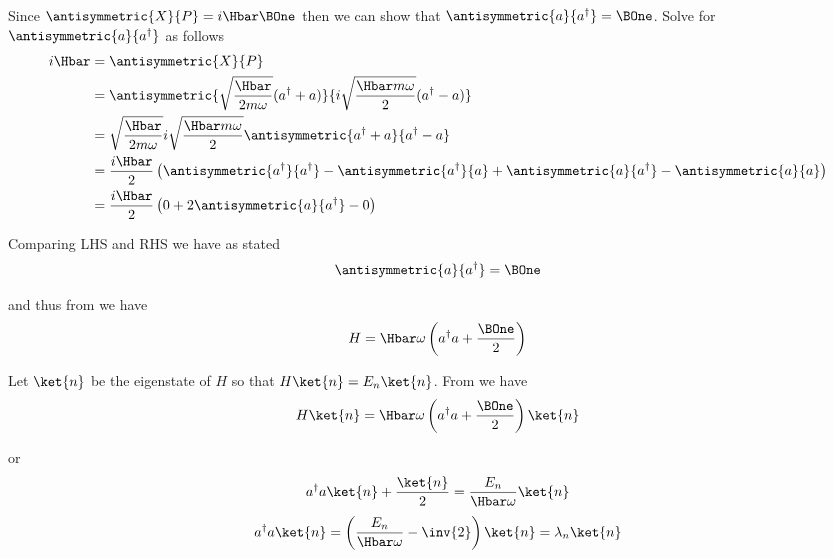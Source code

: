 Since \(\antisymmetric{X}{P} = i \Hbar \BOne\) then we can show that \(\antisymmetric{a}{a^\dagger} = \BOne\).  Solve for \(\antisymmetric{a}{a^\dagger}\) as follows
%
\begin{equation}\label{eqn:lecture11harmonicOscillator:660}
\begin{aligned}
i \Hbar
&=
\antisymmetric{X}{P} \\
&=
\antisymmetric{\sqrt{\frac{\Hbar}{2 m \omega}} (a^\dagger + a) }{i \sqrt{\frac{\Hbar m \omega}{2}} (a^\dagger -a)} \\
&=
\sqrt{\frac{\Hbar}{2 m \omega}} i \sqrt{\frac{\Hbar m \omega}{2}}
\antisymmetric{a^\dagger + a}{a^\dagger -a} \\
&= \frac{i \Hbar}{2}
\left(
\antisymmetric{a^\dagger}{a^\dagger}
-\antisymmetric{a^\dagger}{a}
+\antisymmetric{a}{a^\dagger}
-\antisymmetric{a}{a} \right)  \\
&= \frac{i \Hbar}{2}
\left(
0
+2 \antisymmetric{a}{a^\dagger}
-0
\right)
\end{aligned}
\end{equation}

Comparing LHS and RHS we have as stated
%
\begin{equation}\label{eqn:PHY356FLecture11:40}
\begin{aligned}
\antisymmetric{a}{a^\dagger} = \BOne
\end{aligned}
\end{equation}

and thus from  we have
%
\begin{equation}\label{eqn:PHY356FLecture11:50}
H = \Hbar \omega \left( a^\dagger a + \frac{\BOne}{2} \right)
\end{equation}

Let \(\ket{n}\) be the eigenstate of \(H\) so that \(H\ket{n} = E_n \ket{n}\).  From  we have
%
\begin{equation}\label{eqn:PHY356FLecture11:60}
H \ket{n}
=
\Hbar \omega \left( a^\dagger a + \frac{\BOne}{2} \right) \ket{n}
\end{equation}

or
\begin{equation}\label{eqn:PHY356FLecture11:70}
a^\dagger a \ket{n} + \frac{\ket{n}}{2} = \frac{E_n}{\Hbar \omega} \ket{n}
\end{equation}
%
\begin{equation}\label{eqn:PHY356FLecture11:80}
a^\dagger a \ket{n} = \left( \frac{E_n}{\Hbar \omega} - \inv{2} \right) \ket{n} = \lambda_n \ket{n}
\end{equation}

